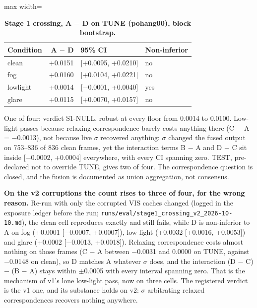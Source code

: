 \documentclass[10pt]{article}
\begin{document}
\begin{table}[htbp]
\centering
\small
\caption{\textbf{Stage 1 crossing, A $-$ D on TUNE (pohang00), block bootstrap.}}
\label{tab:5}
\begin{adjustbox}{max width=\linewidth}
\begin{tabular}{lrll}
\toprule
Condition & A $-$ D & 95\% CI & Non-inferior \\
\midrule
clean & +0.0151 & [+0.0095, +0.0210] & no \\
fog & +0.0160 & [+0.0104, +0.0221] & no \\
lowlight & +0.0014 & [$-$0.0001, +0.0040] & yes \\
glare & +0.0115 & [+0.0070, +0.0157] & no \\
\bottomrule
\end{tabular}
\end{adjustbox}
\end{table}
One of four: verdict S1-NULL, robust at every floor from 0.0014 to 0.0100. Low-light passes because relaxing correspondence barely costs anything there (C $-$ A = $-$0.0013), not because live $\sigma$ recovered anything: $\sigma$ changed the fused output on 753--836 of 836 clean frames, yet the interaction terms B $-$ A and D $-$ C sit inside [$-$0.0002, +0.0004] everywhere, with every CI spanning zero. TEST, pre-declared not to override TUNE, gives two of four. The correspondence question is closed, and the fusion is documented as union aggregation, not consensus.

\textbf{On the v2 corruptions the count rises to three of four, for the wrong reason.} Re-run with only the corrupted VIS caches changed (logged in the exposure ledger before the run; \texttt{runs/\allowbreak{}eval/\allowbreak{}stage1\_\allowbreak{}crossing\_\allowbreak{}v2\_\allowbreak{}2026-10-10.md}), the clean cell reproduces exactly and still fails, while D is non-inferior to A on fog (+0.0001 [$-$0.0007, +0.0007]), low light (+0.0032 [+0.0016, +0.0053]) and glare (+0.0002 [$-$0.0013, +0.0018]). Relaxing correspondence costs almost nothing on those frames (C $-$ A between $-$0.0031 and 0.0000 on TUNE, against $-$0.0148 on clean), so D matches A whatever $\sigma$ does, and the interaction (D $-$ C) $-$ (B $-$ A) stays within $\pm$0.0005 with every interval spanning zero. That is the mechanism of v1's lone low-light pass, now on three cells. The registered verdict is the v1 one, and its substance holds on v2: $\sigma$ arbitrating relaxed correspondences recovers nothing anywhere.
\end{document}
